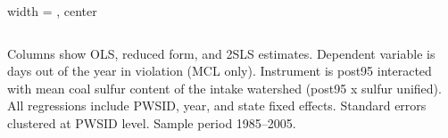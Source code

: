 \begin{table}[htbp]
\begin{adjustbox}{width = \textwidth, center}
\begin{tabular}{lcccccccccccc}
      \end{tabular}
      
      
      
   \end{adjustbox}
      {\tiny\linespread{1}\selectfont \par \raggedright 
   Columns show OLS, reduced form, and 2SLS estimates. Dependent variable is days out of the year in violation (MCL only). Instrument is post95 interacted with mean coal sulfur content of the intake watershed (post95 x sulfur unified). All regressions include PWSID, year, and state fixed effects. Standard errors clustered at PWSID level. Sample period 1985--2005.}
   
\end{table}



